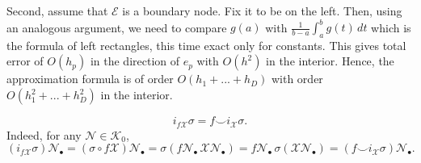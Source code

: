 \begin{remark}
  Second, assume that $\mathcal{E}$ is a boundary node.
  Fix it to be on the left.
  Then, using an analogous argument, we need to compare
  $g(a)$ with $\frac{1}{b - a} \int_a^b g(t)\, dt$
  which is the formula of left rectangles, this time exact only for constants.
  This gives total error of $O(h_p)$ in the direction of $e_p$ with $O(h^2)$ in
  the interior.
  Hence, the approximation formula is of order $O(h_1 + ... + h_D)$ with order
  $O(h_1^2 + ... + h_D^2)$ in the interior.
\end{remark}
\begin{remark}
  \begin{equation}
    i_{f \mathcal{X}} \sigma = f \smile i_\mathcal{X} \sigma.
  \end{equation}
  Indeed, for any $\mathcal{N} \in \mathcal{K}_0$,
  \begin{equation}
    (i_{f \mathcal{X}} \sigma) \mathcal{N}_\bullet
    = (\sigma \circ {f \mathcal{X}}) \mathcal{N}_\bullet
    = \sigma (f \mathcal{N}_\bullet\, \mathcal{X} \mathcal{N}_\bullet)
    = f \mathcal{N}_\bullet\, \sigma(\mathcal{X} \mathcal{N}_\bullet)
    = (f \smile i_\mathcal{X} \sigma) \mathcal{N}_\bullet.
  \end{equation}
\end{remark}
